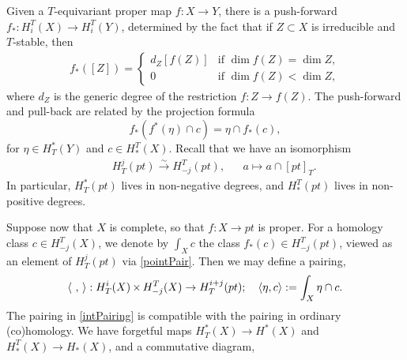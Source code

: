 \documentclass[10pt]{article}
\numberwithin{thm}{section}
\theoremstyle{definition}
\theoremstyle{remark}
\newcommand{\todo}[2][0.9]{\vspace{1 mm}\par \noindent \framebox{{\color{red}\begin{minipage}[c]{#1 \textwidth} \tt #2 \end{minipage}}}\vspace{1 mm}\par}
\begin{document}
Given a $T$-equivariant proper map $f:X\to Y$, 
there is a push-forward $f_*:H_i^T(X) \to H_i^T(Y)$,
determined by the fact that if $Z \subset X$ is irreducible and $T$-stable, 
then
\begin{align*}
f_*([Z])=
\begin{cases}
d_Z[f(Z)]&\text{if }\dim f(Z)=\dim Z,\\
0&\text{if }\dim f(Z)<\dim Z,
\end{cases}
\end{align*}
where $d_Z$ is the generic degree of the restriction $f:Z \to f(Z)$.
The push-forward and pull-back are related by the projection formula 
\begin{equation}
\label{projectionFormula}
f_* (f^*(\eta) \cap c) = \eta \cap f_*(c),
\end{equation}
for $\eta\in H^*_T(Y)$ and $c\in H^T_*(X)$.
Recall that we have an isomorphism
\begin{align}
\label{pointPair}
&&H^j_T(pt)\xrightarrow\sim H_{-j}^T(pt),&&
a\mapsto a\cap[pt]_T.
\end{align} 
In particular, $H^*_T(pt)$ lives in non-negative degrees,
and $H_*^T(pt)$ lives in non-positive degrees.

Suppose now that $X$ is complete, so that $f: X \to pt$ is proper. 
For a homology class $c \in H_{-j}^T(X)$, we denote by 
$\int_X c$ the class $f_*(c) \in H_{-j}^T(pt)$,
viewed as an element of $H_T^{j}(pt)$ via  \cref{pointPair}.
Then we may define a pairing,
 \begin{equation}
\label{intPairing}
\langle\ , \,\rangle : H^i_T(X) \mathop
\times
 H_{-j}^T(X) \to H^{i+j}_T(pt) \/; \quad 
\langle \eta, c \rangle := \int_X \eta \cap c \/. \end{equation}
The pairing in \cref{intPairing} is compatible with the pairing in ordinary (co)homology.
We have forgetful maps $H^*_T(X)\to H^*(X)$ and $H_*^T(X)\to H_*(X)$,
and a commutative diagram,
\begin{center}
\end{center}
\end{document}
